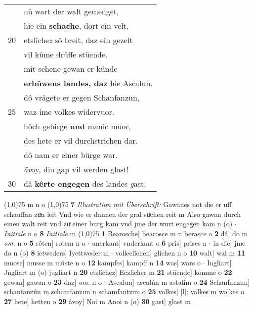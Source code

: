 \documentclass[8pt,a4paper,notitlepage]{article}
\begin{document}
\begin{table}[ht]
\begin{minipage}[t]{0.5\linewidth}
\begin{tabular}{rl}
 & nû wart der walt gemenget,\\ 
 & hie ein \textbf{schache}, dort ein velt,\\ 
20 & etslîche\textit{z} sô breit, daz ein gezelt\\ 
 & vil kûme drûffe stüende.\\ 
 & mit sehene gewan er künde\\ 
 & \textbf{erbûwens landes, daz} hie Ascalun.\\ 
 & dô vrâgete er gegen Schanfanzun,\\ 
25 & waz ime volkes widervuor.\\ 
 & hôch gebirge \textbf{und} manic muor,\\ 
 & des hete er vil durchstrichen dar.\\ 
 & dô nam er einer bürge war.\\ 
 & \textit{âv}oy, diu gap vil werden glast!\\ 
30 & dâ \textbf{kêrte engegen} des landes \textit{g}ast.\\ 
\end{tabular}
\scriptsize
\line(1,0){75} \newline
m n o \newline
\line(1,0){75} \newline
\textbf{7} \textit{Illustration mit Überschrift:} Gawanes not die er uff schauffan zuͯn leit Vnd wie er dannen der gral suͯchen reit m  Also gawan durch einen walt reit vnd zuͯ einer burg kam vnd jme der wurt engegen kam n (o)   $\cdot$ \textit{Initiale} n o  \textbf{8} \textit{Initiale} m  \newline
\line(1,0){75} \newline
\textbf{1} Bearosche] bearosce m n berasce o \textbf{2} dâ] do m \textit{om.} n o \textbf{5} rôten] rotem n o  $\cdot$ unerkant] vnderkant o \textbf{6} prîs] prises n  $\cdot$ in die] jme do n (o) \textbf{8} ietweders] Iyettweder m  $\cdot$ volleclîchen] glichen n o \textbf{10} walt] wal m \textbf{11} muose] musse m múste n o \textbf{12} kampfes] kampff n \textbf{14} was] wars o  $\cdot$ Ingliart] Jngliart m (o) jugliart n \textbf{20} etslîchez] Eczlicher m \textbf{21} stüende] komme o \textbf{22} gewan] gawan o \textbf{23} daz] \textit{om.} n o  $\cdot$ Ascalun] ascalún m astalim o \textbf{24} Schanfanzun] schanfanzún m schamfanzun n schamfantzim o \textbf{25} volkes] [l]: valkes m wolkes o \textbf{27} hete] hetten o \textbf{29} âvoy] Noi m Anoi n (o) \textbf{30} gast] glast m \newline
\end{minipage}
\end{table}
\end{document}
